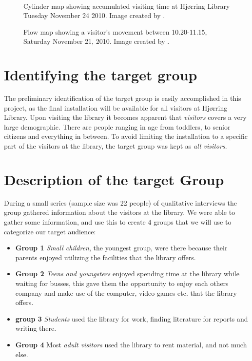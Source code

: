 \begin{figure}[htbp]
\begin{minipage}[b]{0.45\textwidth}
\end{minipage} \\ %
\begin{minipage}[t]{0.45\textwidth}
\caption{Cylinder map showing accumulated visiting time at Hj{\o}rring Library Tuesday November 24 2010. Image created by \citep{hjoerring_study}.} %
\label{fig:library_cylindermap}
\end{minipage} \hfill
\begin{minipage}[t]{0.45\textwidth}
\caption{Flow map showing a visitor's movement between 10.20-11.15, Saturday November 21, 2010. Image created by \citep{hjoerring_study}.} %
\label{fig:library_flowmap}
\end{minipage}
\end{figure}

\section{Identifying the target group}
The preliminary identification of the target group is easily accomplished in this project, as the final installation will be available for all visitors at Hj{\o}rring Library. Upon visiting the library it becomes apparent that \textit{visitors} covers a very large demographic. There are people ranging in age from toddlers, to senior citizens and everything in between. To avoid limiting the installation to a specific part of the visitors at the library, the target group was kept as \textit{all visitors}.

\section{Description of the target Group}
During a small series (sample size was 22 people) of qualitative interviews the group gathered information about the visitors at the library. We were able to gather some information, and use this to create 4 groups that we will use to categorize our target audience:

\begin{itemize}

\item \textbf{Group 1} \textit{Small children}, the youngest group, were there because their parents enjoyed utilizing the facilities that the library offers.

\item \textbf{Group 2} \textit{Teens and youngsters} enjoyed spending time at the library while waiting for busses, this gave them the opportunity to enjoy each others company and make use of the computer, video games etc. that the library offers.

\item \textbf{group 3} \textit{Students} used the library for work, finding literature for reports and writing there.

\item \textbf{Group 4} Most \textit{adult visitors} used the library to rent material, and not much else.

\end{itemize}

